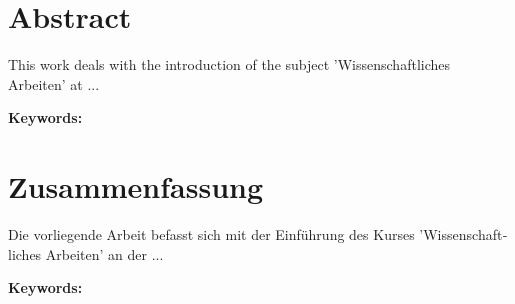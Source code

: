 \documentclass[
  headexclude,
  footexclude,
  10pt,
  a4paper,
  oneside,
  captions=tableheading,
  bibliography=totoc,
  listof=totoc
]{scrbook}
\newenvironment{bibhyphenation}
{\hyphenpenalty=20
  \tolerance=9999
  \exhyphenpenalty=0
  \linepenalty=0
  \setlength{\emergencystretch}{3em}}
{}
\begin{document}
\chapter*{Abstract}

This work deals with the introduction of the subject 'Wissenschaftliches Arbeiten' at ...

\vspace{2cm}

\textbf{Keywords:} \campusKeywords

\chapter*{Zusammenfassung}

\begin{otherlanguage}{austrian}
Die vorliegende Arbeit befasst sich mit der Einführung des Kurses 'Wissenschaftliches Arbeiten' an der ...
\end{otherlanguage}

\vspace{2cm}

\textbf{Keywords:} \campusKeywords

\mainmatter

\setcounter{page}{1}

\pagestyle{scrheadings}
\setlength{\parindent}{0em}
\renewcommand*{\chapterpagestyle}{scrheadings}

\tableofcontents

\clearpage

\setcounter{page}{1}








\clearpage

\printbibheading[heading=bibintoc, title=References]
\begin{bibhyphenation}
  \printbibliography[heading=subbibintoc, title=Bibliography, filter={printed}]
  \printbibliography[heading=subbibintoc, title=Webography, filter={online}]
\end{bibhyphenation}

\clearpage

\ihead[]{\leftmark}
\listoffigures
\listoftables
\printglossary[type=\acronymtype]
\end{document}
